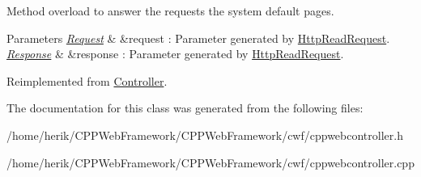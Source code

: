 Method overload to answer the requests the system default pages. 


\begin{DoxyParams}{Parameters}
{\em \hyperlink{class_request}{Request}} & \&request \+: Parameter generated by \hyperlink{class_http_read_request}{Http\+Read\+Request}. \\
\hline
{\em \hyperlink{class_response}{Response}} & \&response \+: Parameter generated by \hyperlink{class_http_read_request}{Http\+Read\+Request}. \\
\hline
\end{DoxyParams}


Reimplemented from \hyperlink{class_controller_aa5d2ca4308e70c23d1d2b31f012b3f00}{Controller}.



The documentation for this class was generated from the following files\+:\begin{DoxyCompactItemize}
\item 
/home/herik/\+C\+P\+P\+Web\+Framework/\+C\+P\+P\+Web\+Framework/cwf/cppwebcontroller.\+h\item 
/home/herik/\+C\+P\+P\+Web\+Framework/\+C\+P\+P\+Web\+Framework/cwf/cppwebcontroller.\+cpp\end{DoxyCompactItemize}
